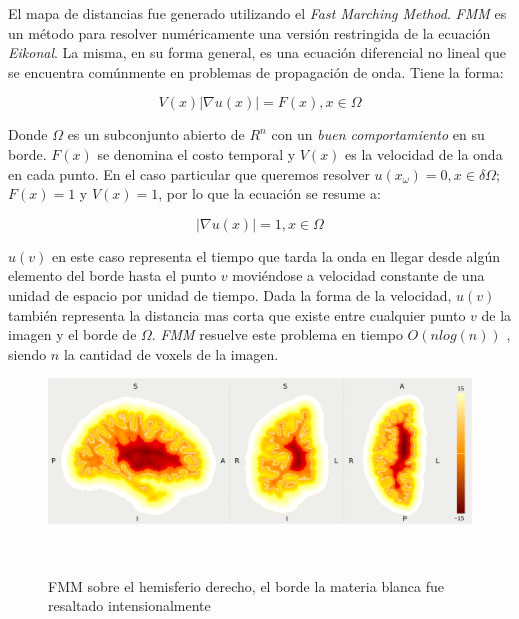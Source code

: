 El mapa de distancias fue generado utilizando el \textit{Fast Marching Method}. 
\textit{FMM} es un m\'etodo para resolver num\'ericamente una versi\'on 
restringida de la ecuaci\'on \textit{Eikonal}. La misma, en su forma general, es
una ecuaci\'on diferencial no lineal que se encuentra com\'unmente en problemas de
propagaci\'on de onda. Tiene la forma: 

$$ V(x) | \nabla u(x) | = F(x) , x \in \Omega $$ 

Donde $\Omega$ es un subconjunto abierto de $R^n$ con un
\textit{buen comportamiento} en su borde. $F(x)$ se denomina el costo temporal y
$V(x)$ es la velocidad de la onda en cada punto. En el caso particular que
queremos resolver $u(x_\omega) = 0, x \in \delta\Omega$;  $F(x)=1$ y $V(x)=1$,
por lo que la ecuaci\'on se resume a:

$$ | \nabla u(x) | = 1 , x \in \Omega $$ 

$u(v)$ en este caso representa el tiempo que tarda la onda en llegar desde
alg\'un elemento del borde hasta el punto $v$ movi\'endose a velocidad constante
de una unidad de espacio por unidad de tiempo. Dada la forma de la velocidad, 
$u(v)$ tambi\'en representa la distancia mas corta que existe entre cualquier
punto $v$ de la imagen y el borde de $\Omega$. \textit{FMM} resuelve este problema
en tiempo $O(n log(n))$ \cite{Sethian2001}, siendo $n$ la cantidad de voxels de 
la imagen.\\

\begin{figure}[h!]
                                                                                                                        
\begin{minipage}[b]{\textwidth}
    \includegraphics[width=\textwidth]{img/fmm.png}
    \caption{FMM sobre el hemisferio derecho, el borde la materia blanca fue
    resaltado intensionalmente}
\end{minipage} ~

\end{figure}  


